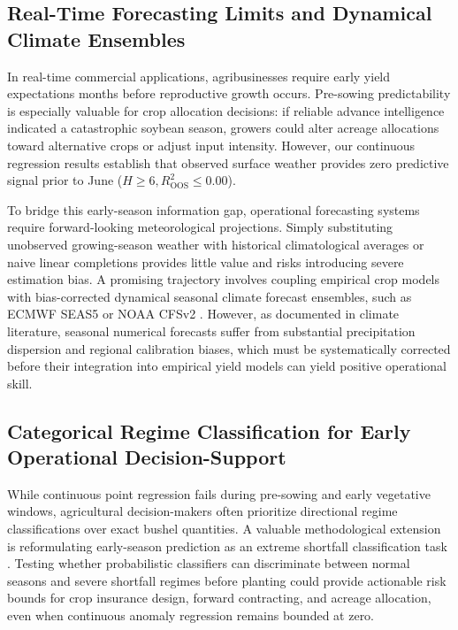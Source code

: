 \subsection{Real-Time Forecasting Limits and Dynamical Climate Ensembles}
In real-time commercial applications, agribusinesses require early yield expectations months before reproductive growth occurs. Pre-sowing predictability is especially valuable for crop allocation decisions: if reliable advance intelligence indicated a catastrophic soybean season, growers could alter acreage allocations toward alternative crops or adjust input intensity. However, our continuous regression results establish that observed surface weather provides zero predictive signal prior to June ($H \ge 6, R^2_{\text{OOS}} \le 0.00$). 

To bridge this early-season information gap, operational forecasting systems require forward-looking meteorological projections. Simply substituting unobserved growing-season weather with historical climatological averages or naive linear completions provides little value and risks introducing severe estimation bias. A promising trajectory involves coupling empirical crop models with bias-corrected dynamical seasonal climate forecast ensembles, such as ECMWF SEAS5 or NOAA CFSv2 \citep{Ceglar2021}. However, as documented in climate literature, seasonal numerical forecasts suffer from substantial precipitation dispersion and regional calibration biases, which must be systematically corrected before their integration into empirical yield models can yield positive operational skill.

\subsection{Categorical Regime Classification for Early Operational Decision-Support}
While continuous point regression fails during pre-sowing and early vegetative windows, agricultural decision-makers often prioritize directional regime classifications over exact bushel quantities. A valuable methodological extension is reformulating early-season prediction as an extreme shortfall classification task \citep{Iizumietal2021, Vijverberg2023}. Testing whether probabilistic classifiers can discriminate between normal seasons and severe shortfall regimes before planting could provide actionable risk bounds for crop insurance design, forward contracting, and acreage allocation, even when continuous anomaly regression remains bounded at zero.

